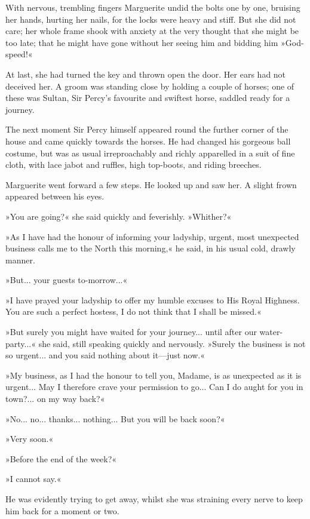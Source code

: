 With nervous, trembling fingers Marguerite undid the bolts one by one, bruising her hands, hurting her nails, for the locks were heavy and stiff. But she did not care; her whole frame shook with anxiety at the very thought that she might be too late; that he might have gone without her seeing him and bidding him »God-speed!«

At last, she had turned the key and thrown open the door. Her ears had not deceived her. A groom was standing close by holding a couple of horses; one of these was Sultan, Sir Percy's favourite and swiftest horse, saddled ready for a journey.

The next moment Sir Percy himself appeared round the further corner of the house and came quickly towards the horses. He had changed his gorgeous ball costume, but was as usual irreproachably and richly apparelled in a suit of fine cloth, with lace jabot and ruffles, high top-boots, and riding breeches.

Marguerite went forward a few steps. He looked up and saw her. A slight frown appeared between his eyes.

»You are going?« she said quickly and feverishly. »Whither?«

»As I have had the honour of informing your ladyship, urgent, most unexpected business calls me to the North this morning,« he said, in his usual cold, drawly manner.

»But... your guests to-morrow...«

»I have prayed your ladyship to offer my humble excuses to His Royal Highness. You are such a perfect hostess, I do not think that I shall be missed.«

»But surely you might have waited for your journey... until after our water-party...« she said, still speaking quickly and nervously. »Surely the business is not so urgent... and you said nothing about it\allowbreak---\allowbreak just now.«

»My business, as I had the honour to tell you, Madame, is as unexpected as it is urgent... May I therefore crave your permission to go... Can I do aught for you in town?... on my way back?«

»No... no... thanks... nothing... But you will be back soon?«

»Very soon.«

»Before the end of the week?«

»I cannot say.«

He was evidently trying to get away, whilst she was straining every nerve to keep him back for a moment or two.

